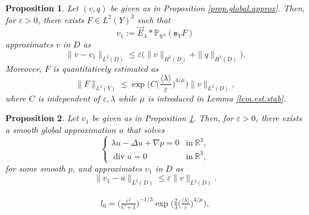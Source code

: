 \documentclass[10pt,a4paper]{amsart}
\newtheorem{proposition}{Proposition}
\newcommand{\R}{\mathbb{R}}
\newcommand{\eps}{\varepsilon}
\newcommand{\opdiv}{\operatorname{div}}
\begin{document}
\begin{proposition}\label{prop.global.approx.step1}
Let $(v, q)$ be given as in Proposition \ref{prop.global.approx}. Then, for $\eps > 0$, there exists $F\in L^2(Y)^3$ such that 
\[
    v_1 
    := 
    \vec{E}_{\lambda} \ast {\mathbb P}_{\R^3} (\mathtt{e}_Y F) 
\]
approximates $v$ in $D$ as 
\[
    \|v - v_1\|_{L^2(D)}
    \le
    \eps 
    \Big( \|v\|_{H^{1}(D)} + \|q\|_{H^{1}(D)} \Big). 
\]
Moreover, $F$ is quantitatively estimated as 
\begin{equation}\label{est.F}
    \|F\|_{L^2(Y)}
    \le
    \exp
    \bigg(
    C
    \Big(\frac{\langle \lambda \rangle}{\eps} \Big)^{4/\mu}
    \bigg)
    \|v\|_{L^2(D)}, 
\end{equation}
where $C$ is independent of $\eps, \lambda$ while $\mu$ is introduced in Lemma \ref{lem.est.stab}. 
\end{proposition}

\begin{proposition}\label{prop.global.approx.step2}
Let $v_1$ be given as in Proposition \ref{prop.global.approx.step1}. Then, for $\eps>0$, there exists a smooth global approximation $u$ that solves 
\[
    \left\{
    \begin{array}{ll}
    \lambda u - \Delta u + \nabla p
    = 0&\mbox{in}\ \R^3, \\
    \opdiv u
    = 0&\mbox{in}\ \R^3, 
    \end{array}\right.
\]
for some smooth $p$, and approximates $v_1$ in $D$ as 
\[
    \|v_1 - u\|_{L^2(D)} 
    \le 
    \eps \|v\|_{L^2(D)}. 
\]
\end{proposition}

\begin{equation}\label{def.l0}
\begin{split}
    l_0
    = 
    \bigg(
    \frac{\eps^2}{C+1}
    \bigg)^{-1/3}
    \exp
    \bigg(
    \frac23
    \Big(\frac{\langle \lambda \rangle}{\eps} \Big)^{4/\mu}
    \bigg), 
\end{split}
\end{equation}
\end{document}
